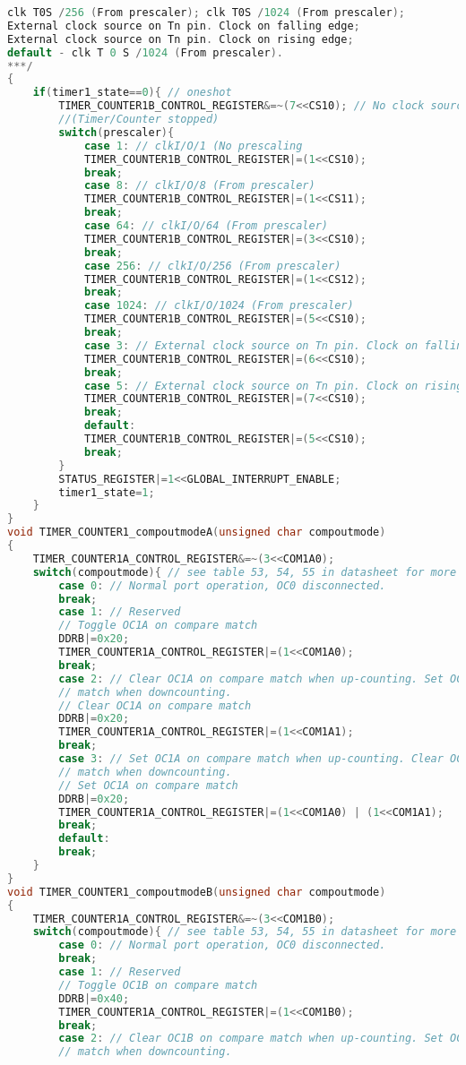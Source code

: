 \begin{lstlisting}[language=C, caption={atmega128timer.c}, label=atmega128timer-c, captionpos=b]
clk T0S /256 (From prescaler); clk T0S /1024 (From prescaler);
External clock source on Tn pin. Clock on falling edge;
External clock source on Tn pin. Clock on rising edge;
default - clk T 0 S /1024 (From prescaler).
***/
{
	if(timer1_state==0){ // oneshot
		TIMER_COUNTER1B_CONTROL_REGISTER&=~(7<<CS10); // No clock source.
		//(Timer/Counter stopped)
		switch(prescaler){
			case 1: // clkI/O/1 (No prescaling
			TIMER_COUNTER1B_CONTROL_REGISTER|=(1<<CS10);
			break;
			case 8: // clkI/O/8 (From prescaler)
			TIMER_COUNTER1B_CONTROL_REGISTER|=(1<<CS11);
			break;
			case 64: // clkI/O/64 (From prescaler)
			TIMER_COUNTER1B_CONTROL_REGISTER|=(3<<CS10);
			break;
			case 256: // clkI/O/256 (From prescaler)
			TIMER_COUNTER1B_CONTROL_REGISTER|=(1<<CS12);
			break;
			case 1024: // clkI/O/1024 (From prescaler)
			TIMER_COUNTER1B_CONTROL_REGISTER|=(5<<CS10);
			break;
			case 3: // External clock source on Tn pin. Clock on falling edge
			TIMER_COUNTER1B_CONTROL_REGISTER|=(6<<CS10);
			break;
			case 5: // External clock source on Tn pin. Clock on rising edge
			TIMER_COUNTER1B_CONTROL_REGISTER|=(7<<CS10);
			break;
			default:
			TIMER_COUNTER1B_CONTROL_REGISTER|=(5<<CS10);
			break;
		}
		STATUS_REGISTER|=1<<GLOBAL_INTERRUPT_ENABLE;
		timer1_state=1;
	}	
}
void TIMER_COUNTER1_compoutmodeA(unsigned char compoutmode)
{
	TIMER_COUNTER1A_CONTROL_REGISTER&=~(3<<COM1A0);
	switch(compoutmode){ // see table 53, 54, 55 in datasheet for more information
		case 0: // Normal port operation, OC0 disconnected.
		break;
		case 1: // Reserved
		// Toggle OC1A on compare match
		DDRB|=0x20;
		TIMER_COUNTER1A_CONTROL_REGISTER|=(1<<COM1A0);
		break;
		case 2: // Clear OC1A on compare match when up-counting. Set OC0 on compare
		// match when downcounting.
		// Clear OC1A on compare match
		DDRB|=0x20;
		TIMER_COUNTER1A_CONTROL_REGISTER|=(1<<COM1A1);
		break;
		case 3: // Set OC1A on compare match when up-counting. Clear OC0 on compare
		// match when downcounting.
		// Set OC1A on compare match
		DDRB|=0x20;
		TIMER_COUNTER1A_CONTROL_REGISTER|=(1<<COM1A0) | (1<<COM1A1);
		break;
		default:
		break;
	}
}
void TIMER_COUNTER1_compoutmodeB(unsigned char compoutmode)
{
	TIMER_COUNTER1A_CONTROL_REGISTER&=~(3<<COM1B0);
	switch(compoutmode){ // see table 53, 54, 55 in datasheet for more information
		case 0: // Normal port operation, OC0 disconnected.
		break;
		case 1: // Reserved
		// Toggle OC1B on compare match
		DDRB|=0x40;
		TIMER_COUNTER1A_CONTROL_REGISTER|=(1<<COM1B0);
		break;
		case 2: // Clear OC1B on compare match when up-counting. Set OC0 on compare
		// match when downcounting.

\end{lstlisting}
